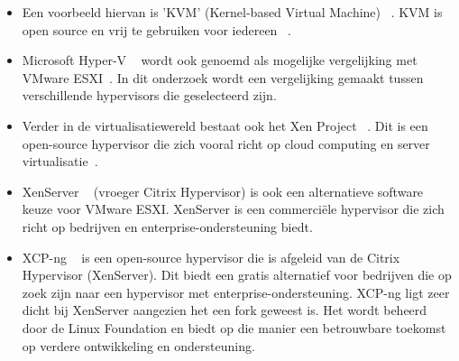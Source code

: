 \begin{itemize}
    \item Een voorbeeld hiervan is 'KVM' (Kernel-based Virtual Machine) ~\autocite{KVM}. KVM is open source en vrij te gebruiken voor iedereen ~\autocite{KVM}.

    \item Microsoft Hyper-V ~\autocite{Eaton2019} wordt ook genoemd als mogelijke vergelijking met VMware ESXI~\autocite{fayyad2013benchmarking}. In dit onderzoek wordt een vergelijking gemaakt tussen verschillende hypervisors die geselecteerd zijn.

    \item Verder in de virtualisatiewereld bestaat ook het Xen Project ~\autocite{xenproject}. Dit is een open-source hypervisor die zich vooral richt op cloud computing en server virtualisatie~\autocite{binu2011virtualization}.

    \item XenServer ~\autocite{xenserverwebsite} (vroeger Citrix Hypervisor) is ook een alternatieve software keuze voor VMware ESXI. XenServer is een commerciële hypervisor die zich richt op bedrijven en enterprise-ondersteuning biedt.

    \item XCP-ng ~\autocite{el2021server} is een open-source hypervisor die is afgeleid van de Citrix Hypervisor (XenServer). Dit biedt een gratis alternatief voor bedrijven die op zoek zijn naar een hypervisor met enterprise-ondersteuning. XCP-ng ligt zeer dicht bij XenServer aangezien het een fork geweest is. Het wordt beheerd door de Linux Foundation en biedt op die manier een betrouwbare toekomst op verdere ontwikkeling en ondersteuning.
\end{itemize}


